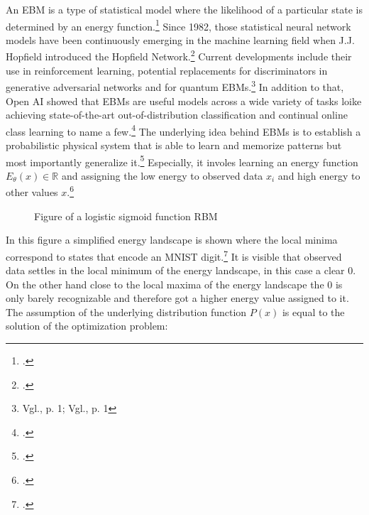An \ac{EBM} is a type of statistical model where the likelihood of a particular state is determined by an energy function.\footcite[Vgl.][2]{huembeliPhysicsEnergybasedModels2022}
Since 1982, those statistical neural network models have been continuously emerging in the machine learning field when J.J. Hopfield introduced the Hopfield Network.\footcite[Vgl.][]{hopfieldNeuralNetworksPhysical1982}
Current developments include their use in reinforcement learning, potential replacements for discriminators in generative adversarial networks and for quantum \ac{EBM}s.\footnote{Vgl.\cite{verdonQuantumHamiltonianBasedModels2019}, p. 1; Vgl.\cite{duModelBasedPlanning2021}, p. 1}
In addition to that, Open AI showed that \ac{EBM}s are useful models across a wide variety of tasks loike achieving state-of-the-art out-of-distribution classification and continual online class learning to name a few.\footcite[Vgl.][1-2]{duImplicitGenerationGeneralization2020}
The underlying idea behind \ac{EBM}s is to establish a probabilistic physical system that is able to learn and memorize patterns but most importantly generalize it.\footcite[Vgl.][2]{huembeliPhysicsEnergybasedModels2022} 
Especially, it involes learning an energy function \(E_{\theta}(x) \in \mathbb{R}\) and assigning the low energy to observed data \(x_i\) and high energy to other values \(x\).\footcite[Vgl.][330]{gustafssonEnergyBasedModelsDeep2020}
\begin{figure}[H]
    \centering
    \caption{Figure of a logistic sigmoid function \ac{RBM}}
\end{figure}
In this figure a simplified energy landscape is shown where the local minima correspond to states that encode an MNIST digit.\footcite[Vgl.][6]{huembeliPhysicsEnergybasedModels2022} It is visible that observed data settles in the local minimum of the energy landscape, in this case a clear 0. On the other hand close to the local maxima of the energy landscape the 0 is only barely recognizable and therefore got a higher energy value assigned to it.
The assumption of the underlying distribution function \( P(x) \)  is equal to the solution of the optimization problem:
